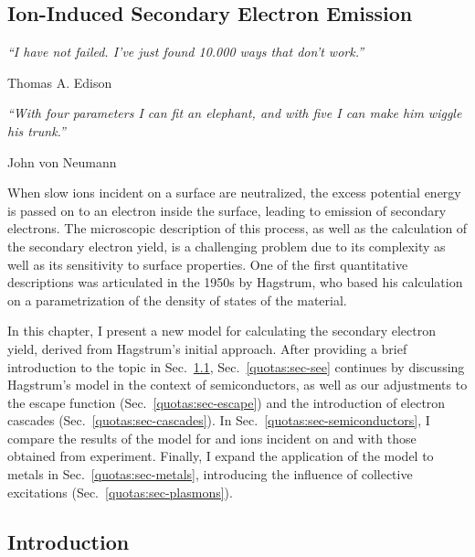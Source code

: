 \begin{refsection}

\chapter{Ion-Induced Secondary Electron Emission} \label{chapter:quotas}

\setlength{\epigraphwidth}{4in}
\epigraph{\textit{``I have not failed. I've just found 10.000 ways that don't work.''}}{Thomas A. Edison}

\setlength{\epigraphwidth}{4in}
\epigraph{\textit{``With four parameters I can fit an elephant, and with five I can make him wiggle his trunk.''}}{John von Neumann}

\vspace{2em}

When slow ions incident on a surface are neutralized, the excess potential energy is passed on to an electron inside the surface, leading to emission of secondary electrons. The microscopic description of this process, as well as the calculation of the secondary electron yield, is a challenging problem due to its complexity as well as its sensitivity to surface properties. One of the first quantitative descriptions was articulated in the 1950s by Hagstrum, who based his calculation on a parametrization of the density of states of the material. 

In this chapter, I present a new model for calculating the secondary electron yield, derived from Hagstrum's initial approach. After providing a brief introduction to the topic in Sec.~\ref{quotas:sec-intro}, Sec.~\ref{quotas:sec-see} continues by discussing Hagstrum's model in the context of semiconductors, as well as our adjustments to the escape function (Sec.~\ref{quotas:sec-escape}) and the introduction of electron cascades (Sec.~\ref{quotas:sec-cascades}). In Sec.~\ref{quotas:sec-semiconductors}, I compare the results of the model for  and  ions incident on  and  with those obtained from experiment. Finally, I expand the application of the model to metals in Sec.~\ref{quotas:sec-metals}, introducing the influence of collective excitations (Sec.~\ref{quotas:sec-plasmons}).


\newpage

\section{Introduction} \label{quotas:sec-intro}


\end{refsection}
